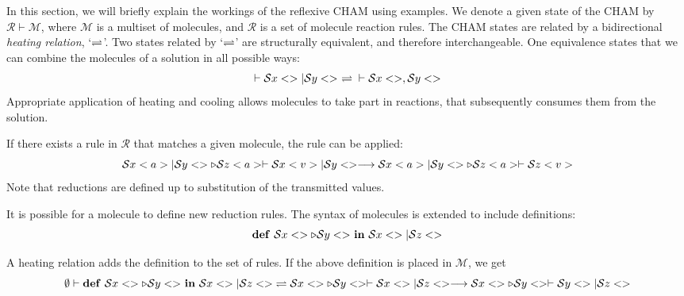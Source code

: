 In this section, we will briefly explain the workings of the reflexive CHAM
using examples.
We denote a given state of the CHAM by $\mathcal{R} \vdash \mathcal{M}$, where
$\mathcal{M}$ is a multiset of molecules, and $\mathcal{R}$ is a set of
molecule reaction rules. The CHAM states are related by a bidirectional
\emph{heating relation}, `$\rightleftharpoons$'. Two states related by
`$\rightleftharpoons$' are structurally equivalent, and therefore interchangeable.
One equivalence states that we can combine the molecules of a solution in all
possible ways:
$$
  \vdash \mathcal{S} x<> | \mathcal{S} y<> \ \rightleftharpoons{} \vdash \mathcal{S} x<>, \mathcal{S} y<>
$$
Appropriate application of heating and cooling allows molecules to take part in
reactions, that subsequently consumes them from the solution.

If there exists a rule in $\mathcal{R}$ that matches a given molecule, the rule
can be applied:
$$
  \mathcal{S} x<a> | \mathcal{S} y<> \triangleright \mathcal{S} z<a> \vdash \mathcal{S} x<v> | \mathcal{S} y<>
  \longrightarrow \mathcal{S} x<a> | \mathcal{S} y<> \triangleright \mathcal{S} z<a> \vdash \mathcal{S} z<v>
$$
Note that reductions are defined up to substitution of the transmitted values.

It is possible for a molecule to define new reduction rules. The syntax of
molecules is extended to include definitions:
$$
  \textrm{\textbf{def}}~{\mathcal{S} x<> \triangleright \mathcal{S} y<>}~\textrm{\textbf{in}}~{\mathcal{S} x<> | \mathcal{S} z<>}
$$

A heating relation adds the definition to the set of rules. If the above
definition is placed in $\mathcal{M}$, we get
$$
 \emptyset \vdash \Def \S x<> \triangleright \S y<> in \S x<> | \S z<>.
 \HeatCool \S x<> \triangleright \S y<> \vdash \S x<> | \S z<>
 \React \S x<> \triangleright \S y<> \vdash \S y<> | \S z<>
$$

